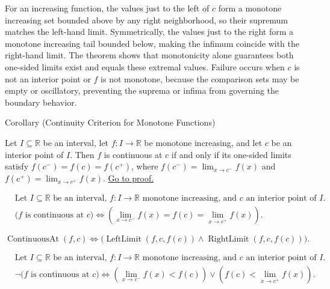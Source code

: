 \begin{remark*}[Interpretation]
For an increasing function, the values just to the left of $c$ form a monotone increasing set bounded above by any right neighborhood, so their supremum matches the left-hand limit. Symmetrically, the values just to the right form a monotone increasing tail bounded below, making the infimum coincide with the right-hand limit. The theorem shows that monotonicity alone guarantees both one-sided limits exist and equals these extremal values. Failure occurs when $c$ is not an interior point or $f$ is not monotone, because the comparison sets may be empty or oscillatory, preventing the suprema or infima from governing the boundary behavior.
\end{remark*}

\NoLocalDependencies
\begin{corollarybox}{Corollary (Continuity Criterion for Monotone Functions)}
\begin{corollary}
\label{cor:monotone-continuity-criterion}
Let $I \subseteq \mathbb{R}$ be an interval, let $f:I \to \mathbb{R}$ be monotone increasing, and let $c$ be an interior point of $I$. Then $f$ is continuous at $c$ if and only if its one-sided limits satisfy $f(c^-)=f(c)=f(c^+)$, where $f(c^-)=\lim_{x\to c^-} f(x)$ and $f(c^+)=\lim_{x\to c^+} f(x)$.
\hyperref[prf:monotone-continuity-criterion]{Go to proof.}
\end{corollary}
\end{corollarybox}

\begin{remark*}
\[
\begin{aligned}
&\text{Let } I \subseteq \mathbb{R} \text{ be an interval, } f:I\to\mathbb{R} \text{ monotone increasing, and } c \text{ an interior point of } I.\\
&\bigl(f \text{ is continuous at } c\bigr)
\Longleftrightarrow
\left(\lim_{x\to c^-} f(x) = f(c) = \lim_{x\to c^+} f(x)\right).
\end{aligned}
\]
\end{remark*}

\begin{remark*}
\[
\operatorname{ContinuousAt}(f,c)
\Longleftrightarrow
\bigl(\operatorname{LeftLimit}(f,c,f(c)) \land \operatorname{RightLimit}(f,c,f(c))\bigr).
\]
\end{remark*}

\begin{remark*}
\[
\begin{aligned}
&\text{Let } I \subseteq \mathbb{R} \text{ be an interval, } f:I\to\mathbb{R} \text{ monotone increasing, and } c \text{ an interior point of } I.\\
&\neg\bigl(f \text{ is continuous at } c\bigr)
\Longleftrightarrow
\left(\lim_{x\to c^-} f(x) < f(c)\right)
\lor
\left(f(c) < \lim_{x\to c^+} f(x)\right).
\end{aligned}
\]
\end{remark*}

